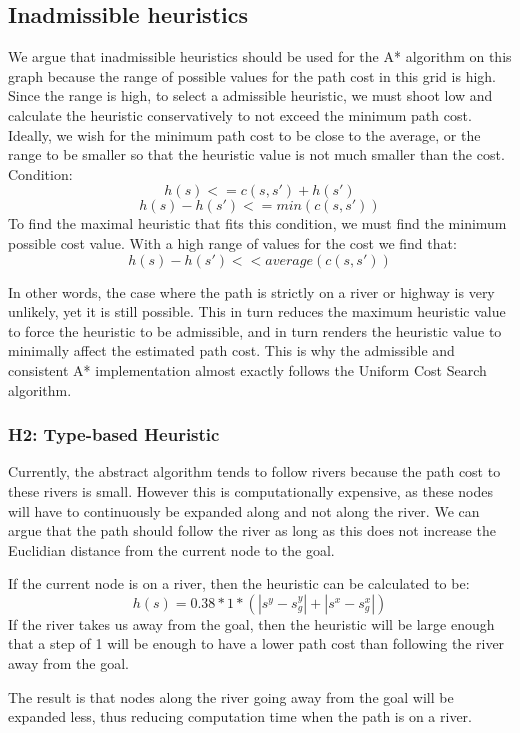 \subsection{Inadmissible heuristics}
We argue that inadmissible heuristics should be used for the A* algorithm on this graph because the range of possible values for the path cost in this grid is high. Since the range is high, to select a admissible heuristic, we must shoot low and calculate the heuristic conservatively to not exceed the minimum path cost. Ideally, we wish for the minimum path cost to be close to the average, or the range to be smaller so that the heuristic value is not much smaller than the cost.
Condition:
\[h(s) <= c(s,s') + h(s') \]
\[h(s) - h(s') <= min(c(s,s'))\]
To find the maximal heuristic that fits this condition, we must find the minimum possible cost value.
With a high range of values for the cost we find that:
\[h(s) - h(s') << average(c(s,s'))\]


In other words, the case where the path is strictly on a river or highway is very unlikely, yet it is still possible. This in turn reduces the maximum heuristic value to force the heuristic to be admissible, and in turn renders the heuristic value to minimally affect the estimated path cost. This is why the admissible and consistent A* implementation almost exactly follows the Uniform Cost Search algorithm.

\subsubsection{H2: Type-based Heuristic}
Currently, the abstract algorithm tends to follow rivers because the path cost to these rivers is small. However this is computationally expensive, as these nodes will have to continuously be expanded along and not along the river. We can argue that the path should follow the river as long as this does not increase the Euclidian distance from the current node to the goal.

If the current node is on a river, then the heuristic can be calculated to be:
\[h(s) = 0.38 * 1 * ( |s^y - s_g^y| + |s^x - s_g^x| )\]
If the river takes us away from the goal, then the heuristic will be large enough that a step of 1 will be enough to have a lower path cost than following the river away from the goal.

The result is that nodes along the river going away from the goal will be expanded less, thus reducing computation time when the path is on a river.

